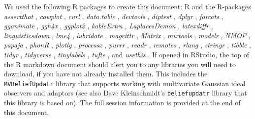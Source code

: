 \documentclass[
  11pt,
  man,floatsintext]{apa6}
\begin{document}
We used the following R packages to create this document: R \autocite[Version 4.4.2;][]{R-base} and the R-packages \emph{assertthat} \autocite[Version 0.2.1;][]{R-assertthat}, \emph{cowplot} \autocite[Version 1.1.3;][]{R-cowplot}, \emph{curl} \autocite[Version 6.2.3;][]{R-curl}, \emph{data.table} \autocite[Version 1.17.6;][]{R-data.table}, \emph{devtools} \autocite[Version 2.4.5;][]{R-devtools}, \emph{diptest} \autocite[Version 0.77.1;][]{R-diptest}, \emph{dplyr} \autocite[Version 1.1.4;][]{R-dplyr}, \emph{forcats} \autocite[Version 1.0.0;][]{R-forcats}, \emph{gganimate} \autocite[Version 1.0.9;][]{R-gganimate}, \emph{ggh4x} \autocite[Version 0.3.0;][]{R-ggh4x}, \emph{ggplot2} \autocite[Version 3.5.2;][]{R-ggplot2}, \emph{kableExtra} \autocite[Version 1.4.0;][]{R-kableExtra}, \emph{LaplacesDemon} \autocite[Version 16.1.6;][]{R-LaplacesDemon}, \emph{latexdiffr} \autocite[Version 0.2.0;][]{R-latexdiffr}, \emph{linguisticsdown} \autocite[Version 1.2.0;][]{R-linguisticsdown}, \emph{lme4} \autocite[Version 1.1.37;][]{R-lme4}, \emph{lubridate} \autocite[Version 1.9.4;][]{R-lubridate}, \emph{magrittr} \autocite[Version 2.0.3;][]{R-magrittr}, \emph{Matrix} \autocite[Version 1.7.3;][]{R-Matrix}, \emph{mixtools} \autocite[Version 2.0.0.1;][]{R-mixtools}, \emph{modelr} \autocite[Version 0.1.11;][]{R-modelr}, \emph{NMOF} \autocite[Version 2.10.1;][]{R-NMOF}, \emph{papaja} \autocite[Version 0.1.1.9,001;][]{R-papaja}, \emph{phonR} \autocite[Version 1.0.7;][]{R-phonR}, \emph{plotly} \autocite[Version 4.10.4;][]{R-plotly}, \emph{processx} \autocite[Version 3.8.6;][]{R-processx}, \emph{purrr} \autocite[Version 1.0.4;][]{R-purrr}, \emph{readr} \autocite[Version 2.1.5;][]{R-readr}, \emph{remotes} \autocite[Version 2.5.0;][]{R-remotes}, \emph{rlang} \autocite[Version 1.1.6;][]{R-rlang}, \emph{stringr} \autocite[Version 1.5.1;][]{R-stringr}, \emph{tibble} \autocite[Version 3.3.0;][]{R-tibble}, \emph{tidyr} \autocite[Version 1.3.1;][]{R-tidyr}, \emph{tidyverse} \autocite[Version 2.0.0;][]{R-tidyverse}, \emph{tinylabels} \autocite[Version 0.2.5;][]{R-tinylabels}, \emph{tufte} \autocite[Version 0.13;][]{R-tufte}, and \emph{usethis} \autocite[Version 3.1.0;][]{R-usethis}. If opened in RStudio, the top of the R markdown document should alert you to any libraries you will need to download, if you have not already installed them. This includes the \texttt{MVBeliefUpdatr} library that supports working with multivariate Gaussian ideal observers and adaptors (see also Dave Kleinschmidt's \texttt{beliefupdatr} library that this library is based on). The full session information is provided at the end of this document.
\end{document}
